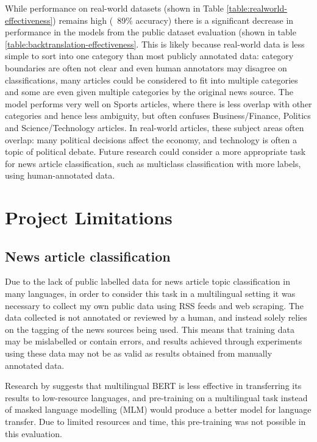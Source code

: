 \documentclass{l4proj}
\begin{document}
While performance on real-world datasets (shown in Table \ref{table:realworld-effectiveness}) remains high (~89\% accuracy) there is a significant decrease in performance in the models from the public dataset evaluation (shown in table \ref{table:backtranslation-effectiveness}. This is likely because real-world data is less simple to sort into one category than most publicly annotated data: category boundaries are often not clear and even human annotators may disagree on classifications, many articles could be considered to fit into multiple categories and some are even given multiple categories by the original news source. The model performs very well on Sports articles, where there is less overlap with other categories and hence less ambiguity, but often confuses Business/Finance, Politics and Science/Technology articles. In real-world articles, these subject areas often overlap: many political decisions affect the economy, and technology is often a topic of political debate. Future research could consider a more appropriate task for news article classification, such as multiclass classification with more labels, using human-annotated data.

\section{Project Limitations}
\subsection{News article classification}
Due to the lack of public labelled data for news article topic classification in many languages, in order to consider this task in a multilingual setting it was necessary to collect my own public data using RSS feeds and web scraping. The data collected is not annotated or reviewed by a human, and instead solely relies on the tagging of the news sources being used. This means that training data may be mislabelled or contain errors, and results achieved through experiments using these data may not be as valid as results obtained from manually annotated data. \par
Research by \cite{wu2020all} suggests that multilingual BERT is less effective in transferring its results to low-resource languages, and pre-training on a multilingual task instead of masked language modelling (MLM) would produce a better model for language transfer. Due to limited resources and time, this pre-training was not possible in this evaluation.
\end{document}

